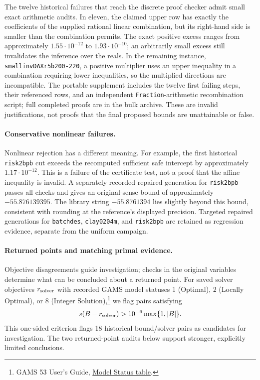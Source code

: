 The twelve historical failures that reach the discrete proof checker admit
small exact arithmetic audits. In eleven, the claimed upper row has exactly
the coefficients of the supplied rational linear combination, but its
right-hand side is smaller than the combination permits. The exact
positive excess ranges from approximately $1.55\cdot10^{-12}$ to
$1.93\cdot10^{-10}$; an arbitrarily small excess still invalidates the
inference over the reals. In the remaining instance,
\texttt{smallinvDAXr5b200-220}, a positive multiplier uses an upper inequality
in a combination requiring lower inequalities, so the multiplied directions are
incompatible. The portable supplement includes the twelve first failing
steps, their referenced rows, and an independent \texttt{Fraction}-arithmetic
recombination script; full completed proofs are in the bulk archive.
These are invalid justifications, not proofs that the final proposed bounds
are unattainable or false.

\paragraph{Conservative nonlinear failures.}
Nonlinear rejection has a different meaning. For example, the first
historical \texttt{risk2bpb} cut exceeds the recomputed sufficient safe
intercept by approximately $1.17\cdot10^{-12}$. This is a failure of the
certificate test, not a proof that the affine inequality is invalid.
A separately recorded repaired generation for \texttt{risk2bpb} passes all
checks and gives an original-sense bound of approximately $-55.876139395$.
The library string $-55.8761394$ lies slightly beyond this bound, consistent
with rounding at the reference's displayed precision. Targeted repaired
generations for \texttt{batchdes}, \texttt{clay0204m}, and \texttt{risk2bpb}
are retained as regression evidence, separate from the uniform campaign.

\paragraph{Returned points and matching primal evidence.}
\label{sec:solver-audits}
Objective disagreements guide investigation; checks in the original variables
determine what can be concluded about a returned point. For saved solver
objectives $r_{\rm solver}$ with recorded GAMS model
statuses 1 (Optimal), 2 (Locally Optimal), or 8 (Integer Solution),\footnote{GAMS 53 User's Guide, \href{https://www.gams.com/53/docs/UG_GAMSOutput.html}{Model Status table}.}
we flag pairs satisfying
\[
 s(B-r_{\rm solver})>10^{-6}\max\{1,|B|\}.
\]
This one-sided criterion flags 18 historical bound/solver pairs as candidates
for investigation. The two returned-point audits below support stronger,
explicitly limited conclusions.

